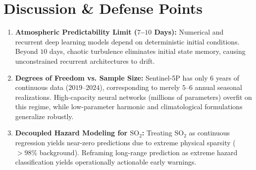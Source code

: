 ﻿\documentclass[10pt,a4paper]{article}
\begin{document}
\section{Discussion \& Defense Points}
\begin{enumerate}
    \item \textbf{Atmospheric Predictability Limit ($7$--$10$ Days):} Numerical and recurrent deep learning models depend on deterministic initial conditions. Beyond $10$ days, chaotic turbulence eliminates initial state memory, causing unconstrained recurrent architectures to drift.
    \item \textbf{Degrees of Freedom vs. Sample Size:} Sentinel-5P has only $6$ years of continuous data ($2019$--$2024$), corresponding to merely $5$--$6$ annual seasonal realizations. High-capacity neural networks (millions of parameters) overfit on this regime, while low-parameter harmonic and climatological formulations generalize robustly.
    \item \textbf{Decoupled Hazard Modeling for $\text{SO}_2$:} Treating $\text{SO}_2$ as continuous regression yields near-zero predictions due to extreme physical sparsity ($>98\%$ background). Reframing long-range prediction as extreme hazard classification yields operationally actionable early warnings.
\end{enumerate}
\end{document}

